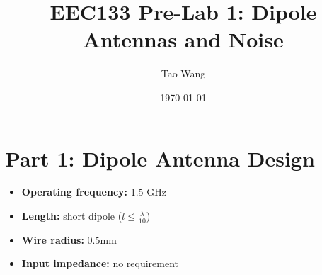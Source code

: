 \documentclass{article} %
\begin{document}
\title{EEC133 Pre-Lab 1: Dipole Antennas and Noise}
\author{Tao Wang}
\date{\today}

\maketitle
\tableofcontents

\section*{Part 1: Dipole Antenna Design}
\begin{itemize}
    \item \textbf{Operating frequency:} 1.5 GHz
    \item \textbf{Length:} short dipole ($l \leq \frac{\lambda}{10}$)
    \item \textbf{Wire radius:} 0.5mm
    \item \textbf{Input impedance:} no requirement
\end{itemize}
\end{document}
